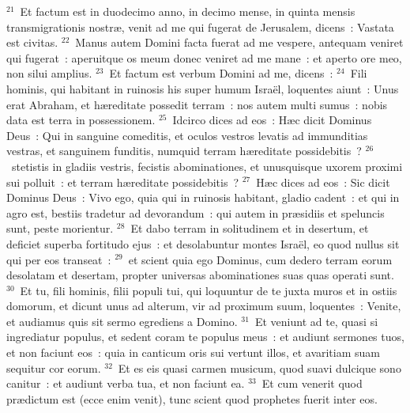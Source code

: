 ${}^{21}$~Et factum est in duodecimo anno, in decimo mense, in quinta mensis transmigrationis nostr\ae , venit ad me qui fugerat de Jerusalem, dicens~: Vastata est civitas.
${}^{22}$~Manus autem Domini facta fuerat ad me vespere, antequam veniret qui fugerat~: aperuitque os meum donec veniret ad me mane~: et aperto ore meo, non silui amplius.
${}^{23}$~Et factum est verbum Domini ad me, dicens~:
${}^{24}$~Fili hominis, qui habitant in ruinosis his super humum Isra\"el, loquentes aiunt~: Unus erat Abraham, et h\ae reditate possedit terram~: nos autem multi sumus~: nobis data est terra in possessionem.
${}^{25}$~Idcirco dices ad eos~: H\ae c dicit Dominus Deus~: Qui in sanguine comeditis, et oculos vestros levatis ad immunditias vestras, et sanguinem funditis, numquid terram h\ae reditate possidebitis~?
${}^{26}$~stetistis in gladiis vestris, fecistis abominationes, et unusquisque uxorem proximi sui polluit~: et terram h\ae reditate possidebitis~?
${}^{27}$~H\ae c dices ad eos~: Sic dicit Dominus Deus~: Vivo ego, quia qui in ruinosis habitant, gladio cadent~: et qui in agro est, bestiis tradetur ad devorandum~: qui autem in pr\ae sidiis et speluncis sunt, peste morientur.
${}^{28}$~Et dabo terram in solitudinem et in desertum, et deficiet superba fortitudo ejus~: et desolabuntur montes Isra\"el, eo quod nullus sit qui per eos transeat~:
${}^{29}$~et scient quia ego Dominus, cum dedero terram eorum desolatam et desertam, propter universas abominationes suas quas operati sunt.
${}^{30}$~Et tu, fili hominis, filii populi tui, qui loquuntur de te juxta muros et in ostiis domorum, et dicunt unus ad alterum, vir ad proximum suum, loquentes~: Venite, et audiamus quis sit sermo egrediens a Domino.
${}^{31}$~Et veniunt ad te, quasi si ingrediatur populus, et sedent coram te populus meus~: et audiunt sermones tuos, et non faciunt eos~: quia in canticum oris sui vertunt illos, et avaritiam suam sequitur cor eorum.
${}^{32}$~Et es eis quasi carmen musicum, quod suavi dulcique sono canitur~: et audiunt verba tua, et non faciunt ea.
${}^{33}$~Et cum venerit quod pr\ae dictum est (ecce enim venit), tunc scient quod prophetes fuerit inter eos.


